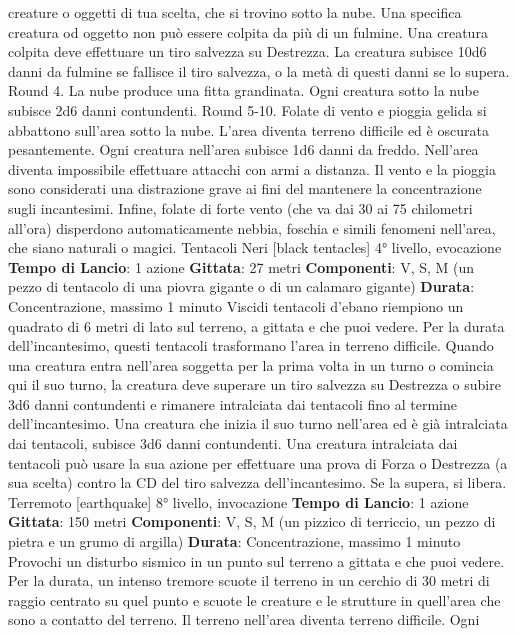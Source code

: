 \begin{multicols}{2}
creature o oggetti di tua scelta, che si trovino sotto la
nube. Una specifica creatura od oggetto non può
essere colpita da più di un fulmine. Una creatura colpita
deve effettuare un tiro salvezza su Destrezza. La
creatura subisce 10d6 danni da fulmine se fallisce il tiro
salvezza, o la metà di questi danni se lo supera.
Round 4. La nube produce una fitta grandinata. Ogni
creatura sotto la nube subisce 2d6 danni contundenti.
Round 5-10. Folate di vento e pioggia gelida si
abbattono sull’area sotto la nube. L’area diventa terreno
difficile ed è oscurata pesantemente. Ogni creatura
nell’area subisce 1d6 danni da freddo. Nell’area diventa
impossibile effettuare attacchi con armi a distanza. Il
vento e la pioggia sono considerati una distrazione
grave ai fini del mantenere la concentrazione sugli
incantesimi. Infine, folate di forte vento (che va dai 30 ai
75 chilometri all’ora) disperdono automaticamente
nebbia, foschia e simili fenomeni nell’area, che siano
naturali o magici.
Tentacoli Neri
[black tentacles]
4° livello, evocazione
\textbf{Tempo di Lancio}: 1 azione
\textbf{Gittata}: 27 metri
\textbf{Componenti}: V, S, M (un pezzo di tentacolo di una
piovra gigante o di un calamaro gigante)
\textbf{Durata}: Concentrazione, massimo 1 minuto
Viscidi tentacoli d’ebano riempiono un quadrato di 6
metri di lato sul terreno, a gittata e che puoi vedere. Per
la durata dell’incantesimo, questi tentacoli trasformano
l’area in terreno difficile.
Quando una creatura entra nell’area soggetta per la
prima volta in un turno o comincia qui il suo turno, la
creatura deve superare un tiro salvezza su Destrezza o
subire 3d6 danni contundenti e rimanere intralciata dai
tentacoli fino al termine dell’incantesimo. Una creatura
che inizia il suo turno nell’area ed è già intralciata dai
tentacoli, subisce 3d6 danni contundenti.
Una creatura intralciata dai tentacoli può usare la sua
azione per effettuare una prova di Forza o Destrezza (a
sua scelta) contro la CD del tiro salvezza
dell’incantesimo. Se la supera, si libera.
Terremoto
[earthquake]
8° livello, invocazione
\textbf{Tempo di Lancio}: 1 azione
\textbf{Gittata}: 150 metri
\textbf{Componenti}: V, S, M (un pizzico di terriccio, un pezzo
di pietra e un grumo di argilla)
\textbf{Durata}: Concentrazione, massimo 1 minuto
Provochi un disturbo sismico in un punto sul terreno a
gittata e che puoi vedere. Per la durata, un intenso
tremore scuote il terreno in un cerchio di 30 metri di
raggio centrato su quel punto e scuote le creature e le
strutture in quell’area che sono a contatto del terreno.
Il terreno nell’area diventa terreno difficile. Ogni

\end{multicols}

